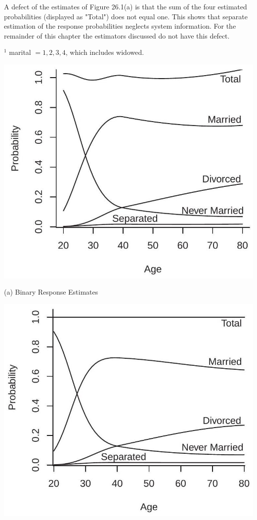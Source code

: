 \documentclass[10pt]{article}
\begin{document}
A defect of the estimates of Figure 26.1(a) is that the sum of the four estimated probabilities (displayed as "Total") does not equal one. This shows that separate estimation of the response probabilities neglects system information. For the remainder of this chapter the estimators discussed do not have this defect.

${ }^{1}$ marital $=1,2,3,4$, which includes widowed.

\includegraphics[max width=\textwidth]{2022_10_23_114e68a1ccdd7fb263a3g-02}

(a) Binary Response Estimates

\includegraphics[max width=\textwidth]{2022_10_23_114e68a1ccdd7fb263a3g-02(1)}
\end{document}
